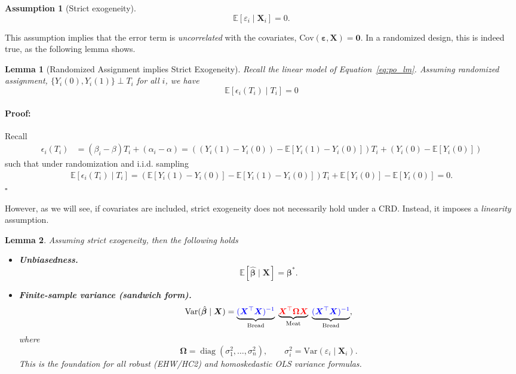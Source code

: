 \documentclass[11pt]{exam}
\theoremstyle{plain}
\newtheorem{assumption}{Assumption}
\newtheorem{lemma}{Lemma}
\newenvironment{proof}{\paragraph{Proof:}}{\hfill$\square$}
\DeclareMathOperator{\diag}{diag}
\newcommand{\E}{\mathbb{E}}
\newcommand{\bX}{\bm{X}}
\newcommand{\Var}{\mathrm{Var}}
\newcommand{\Cov}{\mathrm{Cov}}
\begin{document}
\begin{assumption}[Strict exogeneity]
    \[
    \E[\varepsilon_i \mid \bX_i] = 0.
    \]
\end{assumption}
This assumption implies that the error term is \emph{uncorrelated} with the covariates, $\Cov(\bm{\varepsilon}, \bX) = \bm{0}$. In a randomized design, this is indeed true, as the following lemma shows.

\begin{lemma}[Randomized Assignment implies Strict Exogeneity]\label{lem:randomized_assignment_implies_strict_exogeneity}
    Recall the linear model of Equation~\eqref{eq:po_lm}. Assuming randomized assignment, $\{Y_i(0), Y_i(1)\} \perp T_i$ for all $i$, we have
    \[
    \E[\epsilon_i(T_i) \mid T_i] = 0
    \]
\end{lemma}
\begin{proof}
Recall
    \begin{align*}
        \epsilon_i(T_i) &= (\beta_i - \beta) T_i + (\alpha_i - \alpha) = ((Y_i(1) - Y_i(0)) - \E[Y_i(1) - Y_i(0)]) T_i + (Y_i(0) - \E[Y_i(0)])
    \end{align*}
such that under randomization and i.i.d. sampling
\begin{align*}
    \E[\epsilon_i(T_i) \mid T_i] = (\E[Y_i(1) - Y_i(0)] - \E[Y_i(1) - Y_i(0)]) T_i + \E[Y_i(0)] - \E[Y_i(0)] = 0.
\end{align*}
\end{proof}

However, as we will see, if covariates are included, strict exogeneity does not necessarily hold under a CRD. Instead, it imposes a \emph{linearity} assumption.

\begin{lemma}
    Assuming strict exogeneity, then the following holds
    \begin{itemize}
        \item \textbf{Unbiasedness.}
  \[
    \E[\hat{\bm{\beta}} \mid \bX] = \bm{\beta}^\ast.
  \]   
  \item \textbf{Finite-sample variance (sandwich form).}
  \[
    \Var(\hat{\bm{\beta}} \mid \bX)
    = \underbrace{\color{blue}{(\bX^\top \bX)^{-1}}}_{\text{Bread}}
      \;\underbrace{\color{red}{\bX^\top \bm{\Omega} \bX}}_{\text{Meat}}\;
      \underbrace{\color{blue}{(\bX^\top \bX)^{-1}}}_{\text{Bread}},
  \]
  where
  \[
    \bm{\Omega} = \diag(\sigma_1^2, \ldots, \sigma_n^2),
    \qquad \sigma_i^2 = \Var(\varepsilon_i \mid \bX_i).
  \]
  This is the foundation for all robust (EHW/HC2) and homoskedastic OLS variance formulas.
    \end{itemize}
\end{lemma}
\end{document}
